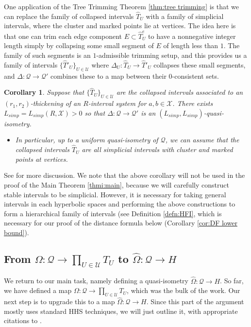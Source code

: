 \documentclass{amsart}
\newtheorem{corollary}[theorem]{Corollary}
\theoremstyle{definition}
\theoremstyle{remark}
\theoremstyle{definition}
\newcommand{\calQ}{\mathcal{Q}}
\newcommand{\calU}{\mathcal{U}}
\newcommand{\calX}{\mathcal{X}}
\newcommand{\hT}{\widehat{T}}
\newcommand{\hO}{\widehat{\Omega}}
\begin{document}
One application of the Tree Trimming Theorem \ref{thm:tree trimming} is that we can replace the family of collapsed intervals $\hT_U$ with a family of simplicial intervals, where the cluster and marked points lie at vertices.  The idea here is that one can trim each edge component $E \subset \hT^e_U$ to have a nonnegative integer length simply by collapsing some small segment of $E$ of length less than $1$.  The family of such segments is an $1$-admissible trimming setup, and this provides us a family of intervals $\{\hT'_U\}_{U \in \calU}$ where $\Delta_U:\hT_U\to \hT'_U$ collapses these small segments, and $\Delta:\calQ \to \calQ'$ combines these to a map between their $0$-consistent sets.

\begin{corollary}\label{cor:simplicial version}
Suppose that $\{\hT_U\}_{U \in \calU}$ are the collapsed intervals associated to an $(r_1,r_2)$-thickening of an $R$-interval system for $a,b \in \calX$.  There exists $L_{simp} = L_{simp}(R, \calX)>0$ so that $\Delta:\calQ \to \calQ'$ is an $(L_{simp},L_{simp})$-quasi-isometry.

\begin{itemize}
\item In particular, up to a uniform quasi-isometry of $\calQ$, we can assume that the collapsed intervals $\hT_U$ are all simplicial intervals with cluster and marked points at vertices. 
\end{itemize}
\end{corollary}

See \cite[Subsection 10.1]{Dur_infcube} for more discussion.  We note that the above corollary will not be used in the proof of the Main Theorem \ref{thmi:main}, because we will carefully construct stable intervals to be simplicial.  However, it is necessary for taking general intervals in each hyperbolic spaces and performing the above constructions to form a hierarchical family of intervals (see Definition \ref{defn:HFI}, which is necessary for our proof of the distance formula below (Corollary \ref{cor:DF lower bound}).


\subsection{From $\Omega:\calQ \to \prod_{U \in \calU} T_U$ to $\hO:\calQ \to H$} \label{subsec:upgrade to HHS}

We return to our main task, namely defining a quasi-isometry $\hO:\calQ \to H$.  So far, we have defined a map $\Omega:\calQ \to \prod_{U \in \calU} T_U$, which was the bulk of the work.  Our next step is to upgrade this to a map $\hO:\calQ \to H$.  Since this part of the argument mostly uses standard HHS techniques, we will just outline it, with appropriate citations to \cite{Dur_infcube}.
\end{document}
